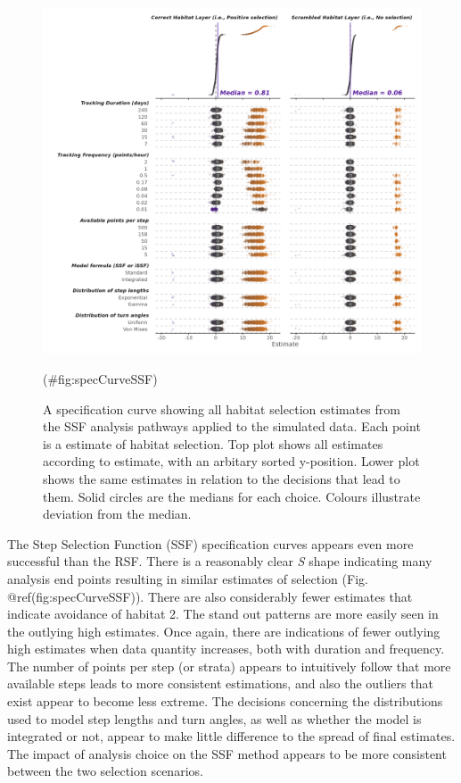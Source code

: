 \documentclass[10pt,a4paper]{article}
\begin{document}
\begin{figure}
\includegraphics[width=1\linewidth]{../figures/ssfSpecCurve} \caption{A specification curve showing all habitat selection estimates from the SSF analysis pathways applied to the simulated data. Each point is a estimate of habitat selection. Top plot shows all estimates according to estimate, with an arbitary sorted y-position. Lower plot shows the same estimates in relation to the decisions that lead to them. Solid circles are the medians for each choice. Colours illustrate deviation from the median.}(\#fig:specCurveSSF)
\end{figure}

The Step Selection Function (SSF) specification curves appears even more successful than the RSF.
There is a reasonably clear \emph{S} shape indicating many analysis end points resulting in similar estimates of selection (Fig. @ref(fig:specCurveSSF)).
There are also considerably fewer estimates that indicate avoidance of habitat 2.
The stand out patterns are more easily seen in the outlying high estimates.
Once again, there are indications of fewer outlying high estimates when data quantity increases, both with duration and frequency.
The number of points per step (or strata) appears to intuitively follow that more available steps leads to more consistent estimations, and also the outliers that exist appear to become less extreme.
The decisions concerning the distributions used to model step lengths and turn angles, as well as whether the model is integrated or not, appear to make little difference to the spread of final estimates.
The impact of analysis choice on the SSF method appears to be more consistent between the two selection scenarios.
\end{document}

